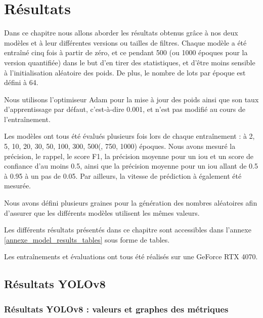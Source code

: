 
\chapter{Résultats} %
\label{Results} %

Dans ce chapitre nous allons aborder les résultats obtenus grâce à nos deux modèles et à leur différentes versions ou tailles de filtres. Chaque modèle a été entraîné cinq fois à partir de zéro, et ce pendant 500 (ou 1000 époques pour la version quantifiée) dans le but d'en tirer des statistiques, et d'être moins sensible à l'initialisation aléatoire des poids. De plus, le nombre de lots par époque est défini à 64.

Nous utilisons l'optimiseur Adam \cite{kingma_adam_2017} pour la mise à jour des poids ainsi que son taux d'apprentissage par défaut, c'est-à-dire 0.001, et n'est pas modifié au cours de l'entraînement.

Les modèles ont tous été évalués plusieurs fois lors de chaque entraînement : à 2, 5, 10, 20, 30, 50, 100, 300, 500(, 750, 1000) époques. Nous avons mesuré la précision, le rappel, le score F1, la précision moyenne pour un \acrshort{iou} et un score de confiance d'au moins 0.5, ainsi que la précision moyenne pour un \acrshort{iou} allant de 0.5 à 0.95 à un pas de 0.05. Par ailleurs, la vitesse de prédiction à également été mesurée.

Nous avons défini plusieurs graines pour la génération des nombres aléatoires afin d'assurer que les différents modèles utilisent les mêmes valeurs.

Les différents résultats présentés dans ce chapitre sont accessibles dans l'annexe \ref{annexe_model_results_tables} sous forme de tables.

Les entraînements et évaluations ont tous été réalisés sur une GeForce RTX 4070.


\section{Résultats YOLOv8}

\subsection{Résultats YOLOv8 : valeurs et graphes des métriques}

